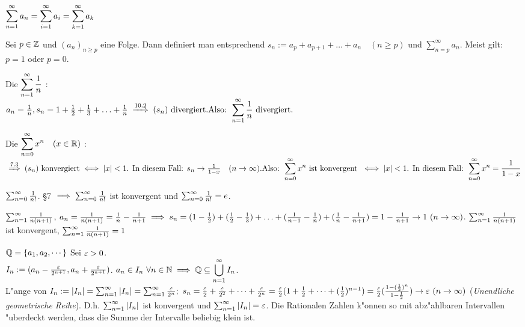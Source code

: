 \documentclass[a4paper,twoside,DIV15,BCOR12mm]{scrbook}
\begin{document}
\begin{bemerkung}
\begin{liste}
\item $\displaystyle{\sum_{n=1}^{\infty}{a_n}= \sum_{i=1}^{\infty}{a_i} = \sum_{k=1}^{\infty}{a_k}}$
\item Sei $p\in\mathbb{Z}$ und $(a_n)_{n \ge p}$ eine Folge. Dann definiert man entsprechend $s_n := a_p+a_{p+1}+\ldots+a_n\quad(n \ge p)$ und $\sum_{n=p}^{\infty}{a_n}$. Meist gilt: $p=1$ oder $p=0$.
\end{liste}
\end{bemerkung}

\begin{beispiele}
\item Die  $\displaystyle{\sum_{n=1}^{\infty}{\frac{1}{n}}}$ :\\
$a_n = \frac{1}{n}, s_n = 1+\frac{1}{2}+\frac{1}{3}+\ldots+\frac{1}{n} \folgtnach{10.2} (s_n) \text{ divergiert.}\\
\text{Also: }\displaystyle\reihe{\frac{1}{n}}\text{ divergiert.}$

\item Die  $\displaystyle{\sum_{n=0}^{\infty}{x^n}}\quad(x\in\mathbb{R})$ :\\
$\folgtnach{7.3} (s_n)\text{ konvergiert} \equizu |x| < 1 \text{. In diesem Fall: } s_n \to \frac{1}{1-x}\quad(n\to\infty).\\
\text{Also: } \displaystyle\reihenull{x^n} \text{ ist konvergent } \equizu |x| < 1 \text{. In diesem Fall: } \displaystyle\reihenull{x^n} = \frac{1}{1-x}$

\item $\sum_{n=0}^{\infty}{\frac{1}{n!}}$. §7 $\implies \sum_{n=0}^{\infty}{\frac{1}{n!}}$ ist konvergent und $\sum_{n=0}^{\infty}{\frac{1}{n!}} = e$.

\item $\sum_{n=1}^{\infty}{\frac{1}{n(n+1)}}$, $a_n=\frac{1}{n(n+1)} = \frac{1}{n} - \frac{1}{n+1} \implies s_n = (1-\frac{1}{2})+(\frac{1}{2} - \frac{1}{3})+\ldots+(\frac{1}{n-1}-\frac{1}{n}) + (\frac{1}n - \frac{1}{n+1}) = 1- \frac{1}{n+1} \to 1 \ (n\to\infty)$. $\sum_{n=1}^{\infty}{\frac{1}{n(n+1)}}$ ist konvergent, $\sum_{n=1}^{\infty}{\frac{1}{n(n+1)}} = 1$
\item $\mathbb{Q}=\{a_1, a_2, \cdots\}$ Sei $\varepsilon>0$.\\ $I_n:=(a_n-\frac{\varepsilon}{2^{n+1}}, a_n+\frac{\varepsilon}{2^{n+1}})$. $a_n \in I_n \ \forall n\in\mathbb{N} \implies \mathbb{Q} \subseteq \displaystyle \bigcup_{n=1}^{\infty}I_n$. \\
L"ange von $I_n:=|I_n|=\reihe{|I_n|}=\reihe{\frac{\ep}{2^n}};\ s_n=\frac{\ep}{2}+\frac{\ep}{2^2}+\cdots+\frac{\ep}{2^n}=\frac{\ep}{2}(1+\frac{1}{2}+\cdots+(\frac{1}{2})^{n-1})=\frac{\ep}{2}(\frac{1-(\frac{1}{2})^n}{1-\frac{1}{2}})\to\ep\ (n\to\infty)$
(\emph{Unendliche geometrische Reihe}). D.h. $\sum_{n=1}^{\infty}{|I_n|}$ ist konvergent und $\sum_{n=1}^{\infty}{|I_n|}=\varepsilon$. Die Rationalen Zahlen k"onnen so mit abz"ahlbaren Intervallen "uberdeckt werden, dass die Summe der Intervalle beliebig klein ist.
\end{beispiele}
\end{document}
